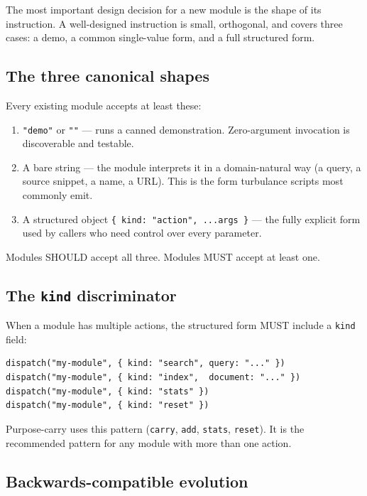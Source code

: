 \documentclass[11pt,a4paper]{article}
\theoremstyle{contract}
\begin{document}
The most important design decision for a new module is the shape of its
instruction. A well-designed instruction is small, orthogonal, and
covers three cases: a demo, a common single-value form, and a full
structured form.

\subsection{The three canonical shapes}

Every existing module accepts at least these:

\begin{enumerate}[nosep,leftmargin=1.4em]
\item \texttt{"demo"} or \texttt{""} --- runs a canned demonstration.
Zero-argument invocation is discoverable and testable.
\item A bare string --- the module interprets it in a domain-natural
way (a query, a source snippet, a name, a URL). This is the form
turbulance scripts most commonly emit.
\item A structured object \texttt{\{ kind: "action", ...args \}} ---
the fully explicit form used by callers who need control over every
parameter.
\end{enumerate}

Modules SHOULD accept all three. Modules MUST accept at least one.

\subsection{The \texttt{kind} discriminator}

When a module has multiple actions, the structured form MUST include a
\texttt{kind} field:

\begin{lstlisting}
dispatch("my-module", { kind: "search", query: "..." })
dispatch("my-module", { kind: "index",  document: "..." })
dispatch("my-module", { kind: "stats" })
dispatch("my-module", { kind: "reset" })
\end{lstlisting}

Purpose-carry uses this pattern (\texttt{carry}, \texttt{add},
\texttt{stats}, \texttt{reset}). It is the recommended pattern for any
module with more than one action.

\subsection{Backwards-compatible evolution}
\end{document}
